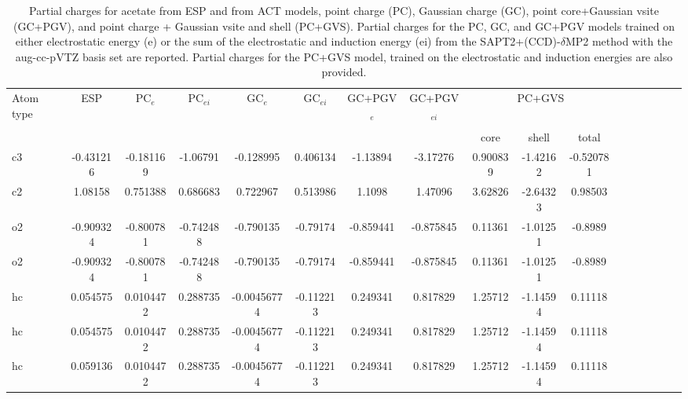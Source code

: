 \begin{sidewaystable}
\caption{Partial charges for acetate from ESP and from ACT models, point charge (PC), Gaussian charge (GC), point core+Gaussian vsite (GC+PGV), and point charge + Gaussian vsite and shell (PC+GVS).  Partial charges for the PC, GC, and GC+PGV models trained on either electrostatic energy (e) or the sum of the electrostatic and induction energy (ei) from the SAPT2+(CCD)-$\delta$MP2 method with the aug-cc-pVTZ basis set are reported. Partial charges for the PC+GVS model, trained on the electrostatic and induction energies are also provided.}
\hspace{-1cm}
\begin{tabular}{lcccccccccccccccc}
\hline
 Atom type & ESP & PC$_{e}$ & PC$_{ei}$ & GC$_{e}$ & GC$_{ei}$ & GC+PGV$_{e}$ & GC+PGV$_{ei}$ & \multicolumn{3}{c}{PC+GVS} \\\\
 & & & & & & & & core & shell & total \\
\hline
c3 & -0.431216 & -0.181169 & -1.06791 & -0.128995 & 0.406134 & -1.13894 & -3.17276 & 0.900839 & -1.42162 & -0.520781 \\
c2 & 1.08158 & 0.751388 & 0.686683 & 0.722967 & 0.513986 & 1.1098 & 1.47096 & 3.62826 & -2.64323 & 0.98503 \\
o2 & -0.909324 & -0.800781 & -0.742488 & -0.790135 & -0.79174 & -0.859441 & -0.875845 & 0.11361 & -1.01251 & -0.8989 \\
o2 & -0.909324 & -0.800781 & -0.742488 & -0.790135 & -0.79174 & -0.859441 & -0.875845 & 0.11361 & -1.01251 & -0.8989 \\
hc & 0.054575 & 0.0104472 & 0.288735 & -0.00456774 & -0.112213 & 0.249341 & 0.817829 & 1.25712 & -1.14594 & 0.11118 \\
hc & 0.054575 & 0.0104472 & 0.288735 & -0.00456774 & -0.112213 & 0.249341 & 0.817829 & 1.25712 & -1.14594 & 0.11118 \\
hc & 0.059136 & 0.0104472 & 0.288735 & -0.00456774 & -0.112213 & 0.249341 & 0.817829 & 1.25712 & -1.14594 & 0.11118 \\
\hline
\end{tabular}
\end{sidewaystable}
